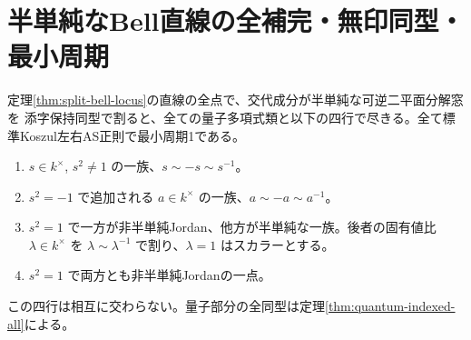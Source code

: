\section{半単純なBell直線の全補完・無印同型・最小周期}
\label{sec:split-spectral-line-classification}
\begin{theorem}\label{thm:split-spectral-line-classification}
定理\ref{thm:split-bell-locus}の直線の全点で、交代成分が半単純な可逆二平面分解窓を
添字保持同型で割ると、全ての量子多項式類と以下の四行で尽きる。全て標準Koszul左右AS正則で最小周期1である。
\begin{enumerate}
\item $s\in k^\times$, $s^2\ne1$ の一族、$s\sim-s\sim s^{-1}$。
\item $s^2=-1$ で追加される $a\in k^\times$ の一族、$a\sim-a\sim a^{-1}$。
\item $s^2=1$ で一方が非半単純Jordan、他方が半単純な一族。後者の固有値比
$\lambda\in k^\times$ を $\lambda\sim\lambda^{-1}$ で割り、$\lambda=1$ はスカラーとする。
\item $s^2=1$ で両方とも非半単純Jordanの一点。
\end{enumerate}
この四行は相互に交わらない。量子部分の全同型は定理\ref{thm:quantum-indexed-all}による。
\end{theorem}
